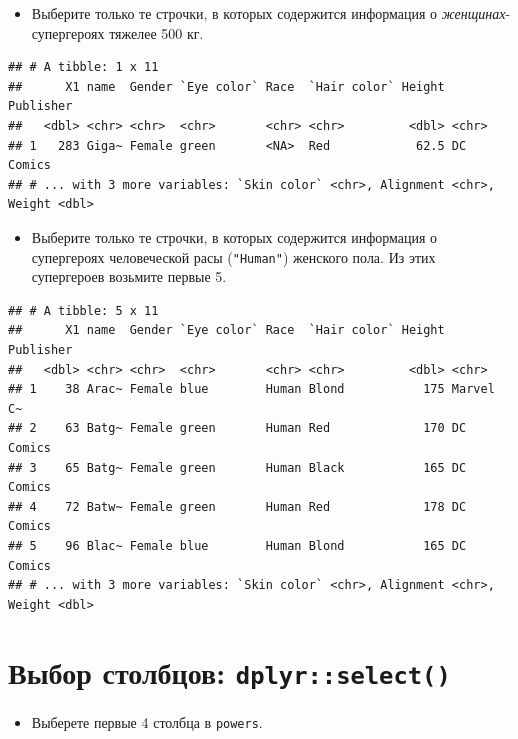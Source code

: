 \documentclass[]{book}
\providecommand{\tightlist}{%
  \setlength{\itemsep}{0pt}\setlength{\parskip}{0pt}}
\begin{document}
\begin{itemize}
\tightlist
\item
  Выберите только те строчки, в которых содержится информация о
  \emph{женщинах}-супергероях тяжелее 500 кг.
\end{itemize}

\begin{verbatim}
## # A tibble: 1 x 11
##      X1 name  Gender `Eye color` Race  `Hair color` Height Publisher
##   <dbl> <chr> <chr>  <chr>       <chr> <chr>         <dbl> <chr>    
## 1   283 Giga~ Female green       <NA>  Red            62.5 DC Comics
## # ... with 3 more variables: `Skin color` <chr>, Alignment <chr>, Weight <dbl>
\end{verbatim}

\begin{itemize}
\tightlist
\item
  Выберите только те строчки, в которых содержится информация о
  супергероях человеческой расы (\texttt{"Human"}) женского пола. Из
  этих супергероев возьмите первые 5.
\end{itemize}

\begin{verbatim}
## # A tibble: 5 x 11
##      X1 name  Gender `Eye color` Race  `Hair color` Height Publisher
##   <dbl> <chr> <chr>  <chr>       <chr> <chr>         <dbl> <chr>    
## 1    38 Arac~ Female blue        Human Blond           175 Marvel C~
## 2    63 Batg~ Female green       Human Red             170 DC Comics
## 3    65 Batg~ Female green       Human Black           165 DC Comics
## 4    72 Batw~ Female green       Human Red             178 DC Comics
## 5    96 Blac~ Female blue        Human Blond           165 DC Comics
## # ... with 3 more variables: `Skin color` <chr>, Alignment <chr>, Weight <dbl>
\end{verbatim}

\section{\texorpdfstring{Выбор столбцов:
\texttt{dplyr::select()}}{Выбор столбцов: dplyr::select()}}\label{task_select}

\begin{itemize}
\tightlist
\item
  Выберете первые 4 столбца в \texttt{powers}.
\end{itemize}
\end{document}
